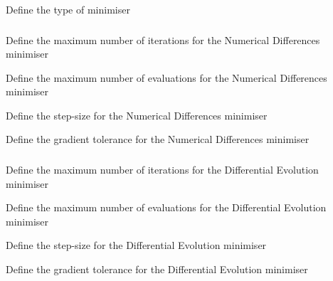 
 {Define the type of minimiser}

\subsubsection[Numerical differences minimiser]{} 

 {Define the maximum number of iterations for the Numerical Differences minimiser}

 {Define the maximum number of evaluations for the Numerical Differences minimiser}

 {Define the step-size for the Numerical Differences minimiser}

 {Define the gradient tolerance for the Numerical Differences minimiser}

\subsubsection[Differential evolution minimiser]{} 

 {Define the maximum number of iterations for the Differential Evolution minimiser}

 {Define the maximum number of evaluations for the Differential Evolution minimiser}

 {Define the step-size for the Differential Evolution minimiser}

 {Define the gradient tolerance for the Differential Evolution minimiser}

